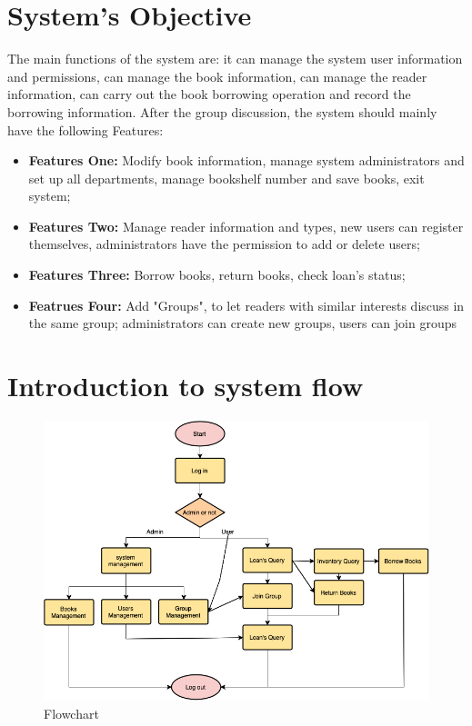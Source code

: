 \section{System's Objective} %

The main functions of the system are: it can manage the system user information and permissions, can manage the book information, can manage the reader information, can carry out the book borrowing operation and record the borrowing information. After the group discussion, the system should mainly have the following Features:

\begin{itemize}
    \item \textbf{Features One:} Modify book information, manage system administrators and set up all departments, manage bookshelf number and save books, exit system;
    \item \textbf{Features Two:} Manage reader information and types, new users can register themselves, administrators have the permission to add or delete users;
    \item \textbf{Features Three:} Borrow books, return books, check loan's status;
    \item \textbf{Featrues Four:} Add "Groups", to let readers with similar interests discuss in the same group; administrators can create new groups, users can join groups
\end{itemize}

\section{Introduction to system flow}

\begin{figure}[htbp!]
\centering
\includegraphics[width=1.0\textwidth]{Figures/Flowchart.png}
\caption[Figures/origindata.png]{Flowchart}
\label{fig:System Flow Chart}
\end{figure}
